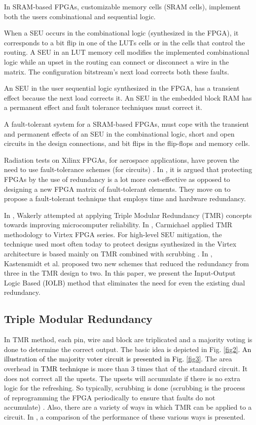 \documentclass[10pt,journal,cspaper,compsoc]{IEEEtran}
\begin{document}
In SRAM-based FPGAs, customizable memory cells (SRAM cells), implement both the users combinational and sequential logic.

 When a SEU occurs in the combinational logic (synthesized in the  FPGA), it corresponds to a bit flip in one of the LUTs
cells or in the cells that control the routing. A SEU in an LUT memory cell modifies the implemented combinational
logic while an upset in the routing can connect or disconnect a wire in the matrix. The configuration bitstream's
next load corrects both these faults.

An SEU in the user sequential logic synthesized in the FPGA, has a transient effect
because the
next load corrects it. An SEU in the embedded block RAM has a permanent
effect and fault tolerance techniques must correct it.


A fault-tolerant system for a SRAM-based FPGAs, must cope with
the transient and permanent
effects of an SEU in the combinational logic, short
and open circuits in the design connections, and bit
flips in the flip-flops and memory cells\cite{KNHCR}.

Radiation tests on Xilinx FPGAs, for aerospace applications, have proven the need to use fault-tolerance schemes (for circuits)  \cite{FCB}. In \textcolor{black}{\cite{KNHCR}}, it is argued that protecting FPGAs by the use of redundancy is a lot more cost-effective as opposed to designing a new FPGA matrix of fault-tolerant elements. They move on to propose a fault-tolerant technique that employs time and hardware redundancy.


In \cite{Wake}, Wakerly attempted at applying Triple Modular Redundancy (TMR) concepts towards improving microcomputer reliability. In \cite{Carm}, Carmichael applied TMR methodology to Virtex FPGA series. For high-level SEU mitigation, the technique used most
often today to protect designs synthesized in the Virtex
architecture is based mainly on TMR combined with
scrubbing \cite{KNHCR}. In \cite{KLCR}, Kastensmidt et al. proposed two new schemes that reduced the redundancy from three in the TMR design to two. In this paper, we present the Input-Output Logic Based (IOLB) method that eliminates the need for even the existing dual redundancy.



\subsection{Triple Modular Redundancy}
In TMR method, each pin, wire and block are triplicated and a majority voting is done to determine the correct output. The basic idea is depicted in Fig. \ref{fig2}. \textcolor{black}{An illustration of the majority voter circuit is presented in Fig. \ref{fig3}}. The area overhead in \textcolor{black}{TMR technique} is more than 3 times that of the standard circuit. It does not correct all the upsets. The upsets will accumulate if there is no extra logic for the refreshing. So typically, scrubbing is done (scrubbing is the process of reprogramming the FPGA periodically to ensure that faults do not accumulate) \cite{Wake,Carm}. Also, there are a variety of ways in which TMR can be applied to a circuit. In \cite{KLCR}, a comparison of the performance of these various ways is presented.
\end{document}
